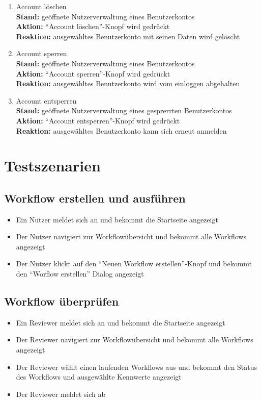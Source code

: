 \begin{enumerate}
    \item Account löschen
    \\ \textbf{Stand:} geöffnete Nutzerverwaltung eines Benutzerkontos
    \\ \textbf{Aktion:} \enquote{Account löschen}-Knopf wird gedrückt
    \\ \textbf{Reaktion:} ausgewähltes Benutzerkonto mit seinen Daten wird gelöscht
    \item Account sperren
    \\ \textbf{Stand:} geöffnete Nutzerverwaltung eines Benutzerkontos
    \\ \textbf{Aktion:} \enquote{Account sperren}-Knopf wird gedrückt
    \\ \textbf{Reaktion:} ausgewähltes Benutzerkonto wird vom einloggen abgehalten
    \item Account entsperren
    \\ \textbf{Stand:} geöffnete Nutzerverwaltung eines gesprerrten Benutzerkontos
    \\ \textbf{Aktion:} \enquote{Account entsperren}-Knopf wird gedrückt
    \\ \textbf{Reaktion:} ausgewähltes Benutzerkonto kann sich erneut anmelden
\end{enumerate}


\section{Testszenarien}

\subsection*{Workflow erstellen und ausführen}
\begin{itemize}
    \item Ein \Gls{Nutzer} meldet sich an und bekommt die Startseite angezeigt
    \item Der \Gls{Nutzer} navigiert zur Workflowübersicht und bekommt alle Workflows angezeigt
    \item Der \gls{Nutzer} klickt auf den \enquote{Neuen Workflow erstellen}-Knopf und bekommt den \enquote{Worflow erstellen} Dialog angezeigt
\end{itemize}

%
\subsection*{Workflow überprüfen}
\begin{itemize}
    \item Ein \Gls{Reviewer} meldet sich an und bekommt die Startseite angezeigt
    \item Der \Gls{Reviewer} navigiert zur Workflowübersicht und bekommt alle Workflows angezeigt
    \item Der \Gls{Reviewer} wählt einen laufenden Workflows aus und bekommt den Status des Workflows und ausgewählte Kennwerte angezeigt
    \item Der \gls{Reviewer} meldet sich ab
\end{itemize}

